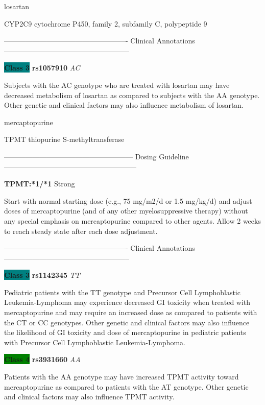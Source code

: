 \documentclass{resume} %
\begin{document}
\begin{rSection}{ losartan }
\begin{rSubsection}{ CYP2C9 }{ cytochrome P450, family 2, subfamily C, polypeptide 9 }{}{}
\item[]

\item[] ---------------------------------------------------- Clinical Annotations -----------------------------------------------------\newline
\item \textbf{\colorbox{teal} {Class 3}} \textbf{ rs1057910 } \textit{ AC }
\item[] Subjects with the AC genotype who are treated with losartan may have decreased metabolism of losartan as compared to subjects with the AA genotype. Other genetic and clinical factors may also influence metabolism of losartan.
\end{rSubsection}

\end{rSection}\begin{rSection}{ mercaptopurine }
\item[]

\begin{rSubsection}{ TPMT }{ thiopurine S-methyltransferase }{}{}
\item[]
\item[] ------------------------------------------------------ Dosing Guideline --------------------------------------------------------\newline
\item[] \textbf{ TPMT:*1/*1 } Strong

\item[] Start with normal starting dose (e.g., 75 mg/m2/d or 1.5 mg/kg/d) and adjust doses of mercaptopurine (and of any other myelosuppressive therapy) without any special emphasis on mercaptopurine compared to other agents. Allow 2 weeks to reach steady state after each dose adjustment.
\item[] ---------------------------------------------------- Clinical Annotations -----------------------------------------------------\newline
\item \textbf{\colorbox{teal} {Class 3}} \textbf{ rs1142345 } \textit{ TT }
\item[] Pediatric patients with the TT genotype and Precursor Cell Lymphoblastic Leukemia-Lymphoma may experience decreased GI toxicity when treated with mercaptopurine and may require an increased dose as compared to patients with the CT or CC genotypes. Other genetic and clinical factors may also influence the likelihood of GI toxicity and dose of mercaptopurine in pediatric patients with Precursor Cell Lymphoblastic Leukemia-Lymphoma.\item \textbf{\colorbox{green} {Class 4}} \textbf{ rs3931660 } \textit{ AA }
\item[] Patients with the AA genotype may have increased TPMT activity toward mercaptopurine as compared to patients with the AT genotype. Other genetic and clinical factors may also influence TPMT activity. 
\end{rSubsection}


\end{rSection}
\end{document}
